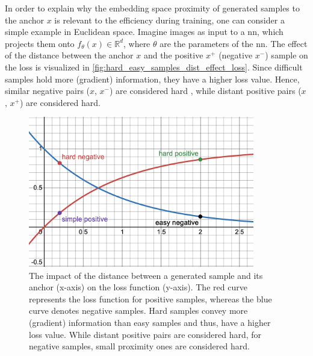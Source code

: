 In order to explain why the embedding space proximity of generated samples to the anchor $x$ 
is relevant to the efficiency during training, 
one can consider a simple example in Euclidean space.
Imagine images as input to a \ac{nn}, which projects them onto $f_{\theta}(x) \in \mathbb{R}^d$, 
where $\theta$ are the parameters of the \ac{nn}.
The effect of the distance between the anchor $x$ and the positive $x^+$ (negative $x^-$) 
sample on the loss is visualized in \autoref{fig:hard_easy_samples_dist_effect_loss}.
Since difficult samples hold more (gradient) information, they have a higher loss value.
Hence, similar negative pairs ($x$, $x^-$) are considered hard \citet{robinson_contrastive_2021}, 
while distant positive pairs ($x$, $x^+$) are considered hard.

%     

\begin{figure}[h] %
    \centering
    \includegraphics[width=280pt]{images/Hard_easy_samples_dist_effect_loss_desmos.png}
    \caption{The impact of the distance between a generated sample and its anchor (x-axis) on the loss function (y-axis).
    The red curve represents the loss function for positive samples, 
    whereas the blue curve denotes negative samples.
    Hard samples convey more (gradient) information than easy samples and thus, have a higher loss value.
    While distant positive pairs are considered hard, for negative samples, small proximity ones are considered hard.}
    \label{fig:hard_easy_samples_dist_effect_loss}
\end{figure}
